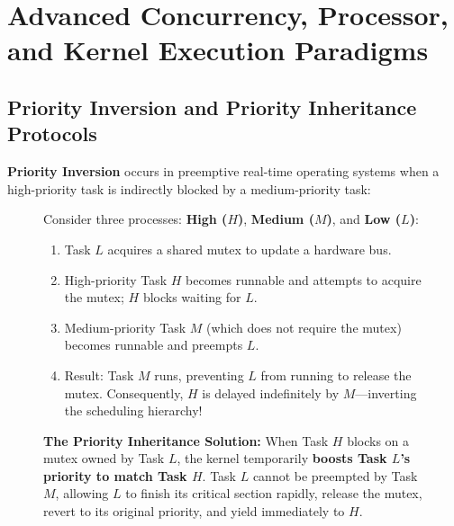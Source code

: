 \section{Advanced Concurrency, Processor, and Kernel Execution Paradigms}
\label{sec:os_adv_kernel_concurrency}

\subsection{Priority Inversion and Priority Inheritance Protocols}
\textbf{Priority Inversion} occurs in preemptive real-time operating systems when a high-priority task is indirectly blocked by a medium-priority task:
\begin{figure}[htbp]
\centering
\begin{tcolorbox}[colback=codebg, colframe=primary, title=\textbf{Priority Inversion Scenario (Mars Pathfinder Incident, 1997)}]
Consider three processes: \textbf{High ($H$)}, \textbf{Medium ($M$)}, and \textbf{Low ($L$)}:
\begin{enumerate}
    \item Task $L$ acquires a shared mutex to update a hardware bus.
    \item High-priority Task $H$ becomes runnable and attempts to acquire the mutex; $H$ blocks waiting for $L$.
    \item Medium-priority Task $M$ (which does not require the mutex) becomes runnable and preempts $L$.
    \item Result: Task $M$ runs, preventing $L$ from running to release the mutex. Consequently, $H$ is delayed indefinitely by $M$—inverting the scheduling hierarchy!
\end{enumerate}
\textbf{The Priority Inheritance Solution:} When Task $H$ blocks on a mutex owned by Task $L$, the kernel temporarily \textbf{boosts Task $L$'s priority to match Task $H$}. Task $L$ cannot be preempted by Task $M$, allowing $L$ to finish its critical section rapidly, release the mutex, revert to its original priority, and yield immediately to $H$.
\end{tcolorbox}
\end{figure}

